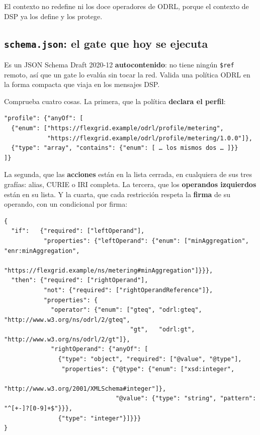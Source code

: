 El contexto no redefine  ni los doce operadores de ODRL, porque el contexto de DSP ya los define y los
protege.

\subsection{\texttt{schema.json}: el gate que hoy se ejecuta}

Es un JSON Schema Draft 2020-12 \textbf{autocontenido}: no tiene ningún \texttt{\$ref} remoto, así que un gate lo
evalúa sin tocar la red. Valida una política ODRL en la forma compacta que viaja en los mensajes DSP.

Comprueba cuatro cosas. La primera, que la política \textbf{declara el perfil}:

\begin{lstlisting}[style=json]
"profile": {"anyOf": [
  {"enum": ["https://flexgrid.example/odrl/profile/metering",
            "https://flexgrid.example/odrl/profile/metering/1.0.0"]},
  {"type": "array", "contains": {"enum": [ … los mismos dos … ]}}
]}
\end{lstlisting}

La segunda, que las \textbf{acciones} están en la lista cerrada, en cualquiera de sus tres grafías: alias, CURIE
o IRI completa. La tercera, que los \textbf{operandos izquierdos} están en su lista. Y la cuarta, que cada
restricción respeta la \textbf{firma} de su operando, con un condicional por firma:

\begin{lstlisting}[style=json]
{
  "if":   {"required": ["leftOperand"],
           "properties": {"leftOperand": {"enum": ["minAggregation", "enr:minAggregation",
                          "https://flexgrid.example/ns/metering#minAggregation"]}}},
  "then": {"required": ["rightOperand"],
           "not": {"required": ["rightOperandReference"]},
           "properties": {
             "operator": {"enum": ["gteq", "odrl:gteq", "http://www.w3.org/ns/odrl/2/gteq",
                                   "gt",   "odrl:gt",   "http://www.w3.org/ns/odrl/2/gt"]},
             "rightOperand": {"anyOf": [
               {"type": "object", "required": ["@value", "@type"],
                "properties": {"@type": {"enum": ["xsd:integer",
                                         "http://www.w3.org/2001/XMLSchema#integer"]},
                               "@value": {"type": "string", "pattern": "^[+-]?[0-9]+$"}}},
               {"type": "integer"}]}}}
}
\end{lstlisting}

